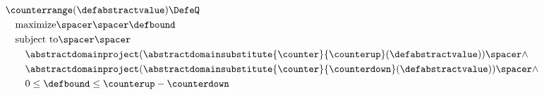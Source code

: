 \begin{align*}
  & \counterrange(\defabstractvalue) \DefeQ \\
  & \quad \text{maximize} \spacer\spacer \defbound \\
  & \quad \text{subject to} \spacer\spacer \\
  & \quad \quad \abstractdomainproject(\abstractdomainsubstitute{\counter}{\counterup}(\defabstractvalue)) \spacer \land \\
  & \quad \quad \abstractdomainproject(\abstractdomainsubstitute{\counter}{\counterdown}(\defabstractvalue)) \spacer \land \\
  & \quad \quad 0 \le \defbound \le \counterup - \counterdown
\end{align*}
